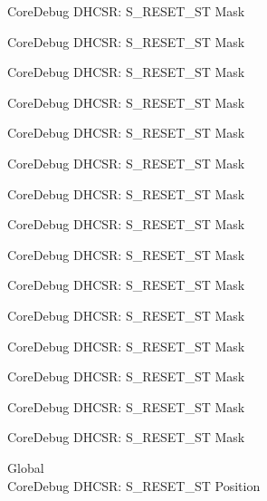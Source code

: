 \begin{DoxyRefList}
\label{deprecated__deprecated000110}%
%
Core\+Debug DHCSR\+: S\+\_\+\+RESET\+\_\+\+ST Mask 

\label{deprecated__deprecated000164}%
%
Core\+Debug DHCSR\+: S\+\_\+\+RESET\+\_\+\+ST Mask 

\label{deprecated__deprecated000249}%
%
Core\+Debug DHCSR\+: S\+\_\+\+RESET\+\_\+\+ST Mask 

\label{deprecated__deprecated000306}%
%
Core\+Debug DHCSR\+: S\+\_\+\+RESET\+\_\+\+ST Mask 

\label{deprecated__deprecated000382}%
%
Core\+Debug DHCSR\+: S\+\_\+\+RESET\+\_\+\+ST Mask 

\label{deprecated__deprecated000461}%
%
Core\+Debug DHCSR\+: S\+\_\+\+RESET\+\_\+\+ST Mask 

\label{deprecated__deprecated000563}%
%
Core\+Debug DHCSR\+: S\+\_\+\+RESET\+\_\+\+ST Mask 

\label{deprecated__deprecated000688}%
%
Core\+Debug DHCSR\+: S\+\_\+\+RESET\+\_\+\+ST Mask 

\label{deprecated__deprecated000788}%
%
Core\+Debug DHCSR\+: S\+\_\+\+RESET\+\_\+\+ST Mask 

\label{deprecated__deprecated000842}%
%
Core\+Debug DHCSR\+: S\+\_\+\+RESET\+\_\+\+ST Mask 

\label{deprecated__deprecated000927}%
%
Core\+Debug DHCSR\+: S\+\_\+\+RESET\+\_\+\+ST Mask 

\label{deprecated__deprecated000984}%
%
Core\+Debug DHCSR\+: S\+\_\+\+RESET\+\_\+\+ST Mask 

\label{deprecated__deprecated001060}%
%
Core\+Debug DHCSR\+: S\+\_\+\+RESET\+\_\+\+ST Mask 

\label{deprecated__deprecated001139}%
%
Core\+Debug DHCSR\+: S\+\_\+\+RESET\+\_\+\+ST Mask 

\label{deprecated__deprecated001241}%
%
Core\+Debug DHCSR\+: S\+\_\+\+RESET\+\_\+\+ST Mask  
\item[Global \doxylink{group___c_m_s_i_s___core_debug_ga6f934c5427ea057394268e541fa97753}{Core\+Debug\+\_\+\+DHCSR\+\_\+\+S\+\_\+\+RESET\+\_\+\+ST\+\_\+\+Pos} ]\hfill \\
\label{deprecated__deprecated000009}%
%
Core\+Debug DHCSR\+: S\+\_\+\+RESET\+\_\+\+ST Position 


\end{DoxyRefList}
